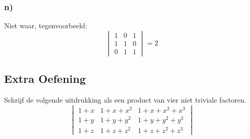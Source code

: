 \documentclass[lineaire_algebra_oplossingen.tex]{subfiles}
\begin{document}
\subsubsection*{n)}
Niet waar, tegenvoorbeeld:
\[
\begin{vmatrix}
1 & 0 & 1\\
1 & 1 & 0\\
0 & 1 & 1
\end{vmatrix}
=2
\]

\subsection{Extra Oefening}
Schrijf de volgende uitdrukking als een product van vier niet triviale factoren.
\[
\begin{vmatrix}
1+x & 1+x+x^{2} & 1+x+x^{2}+x^{3}\\
1+y & 1+y+y^{2} & 1+y+y^{2}+y^{3}\\
1+z & 1+z+z^{2} & 1+z+z^{2}+z^{3}
\end{vmatrix}
\]
\end{document}
